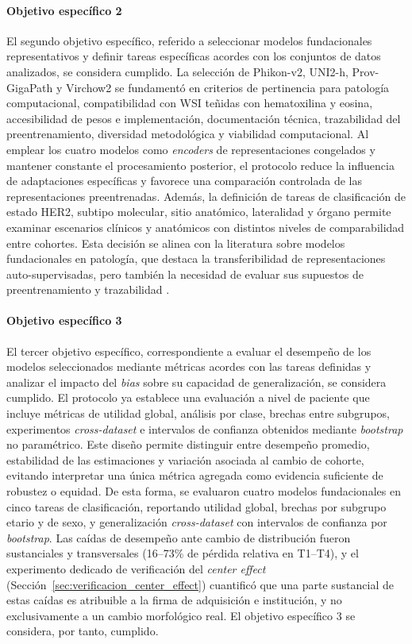 \paragraph{Objetivo específico 2} El segundo objetivo específico, referido a seleccionar modelos fundacionales representativos y definir tareas específicas acordes con los conjuntos de datos analizados, se considera cumplido. La selección de Phikon-v2, UNI2-h, Prov-GigaPath y Virchow2 se fundamentó en criterios de pertinencia para patología computacional, compatibilidad con WSI teñidas con hematoxilina y eosina, accesibilidad de pesos e implementación, documentación técnica, trazabilidad del preentrenamiento, diversidad metodológica y viabilidad computacional. Al emplear los cuatro modelos como \textit{encoders} de representaciones congelados y mantener constante el procesamiento posterior, el protocolo reduce la influencia de adaptaciones específicas y favorece una comparación controlada de las representaciones preentrenadas. Además, la definición de tareas de clasificación de estado HER2, subtipo molecular, sitio anatómico, lateralidad y órgano permite examinar escenarios clínicos y anatómicos con distintos niveles de comparabilidad entre cohortes. Esta decisión se alinea con la literatura sobre modelos fundacionales en patología, que destaca la transferibilidad de representaciones auto-supervisadas, pero también la necesidad de evaluar sus supuestos de preentrenamiento y trazabilidad \parencite{chen2024uni,filiot2024phikonv2,xu2024provgigapath,vorontsov2024virchow}.

\paragraph{Objetivo específico 3} El tercer objetivo específico, correspondiente a evaluar el desempeño de los modelos seleccionados mediante métricas acordes con las tareas definidas y analizar el impacto del \textit{bias} sobre su capacidad de generalización, se considera cumplido. El protocolo ya establece una evaluación a nivel de paciente que incluye métricas de utilidad global, análisis por clase, brechas entre subgrupos, experimentos \textit{cross-dataset} e intervalos de confianza obtenidos mediante \textit{bootstrap} no paramétrico. Este diseño permite distinguir entre desempeño promedio, estabilidad de las estimaciones y variación asociada al cambio de cohorte, evitando interpretar una única métrica agregada como evidencia suficiente de robustez o equidad. De esta forma, se evaluaron cuatro modelos fundacionales en cinco tareas de clasificación, reportando utilidad global, brechas por subgrupo etario y de sexo, y generalización \textit{cross-dataset} con intervalos de confianza por \textit{bootstrap}. Las caídas de desempeño ante cambio de distribución fueron sustanciales y transversales (16--73\% de pérdida relativa en T1--T4), y el experimento dedicado de verificación del \textit{center effect} (Sección~\ref{sec:verificacion_center_effect}) cuantificó que una parte sustancial de estas caídas es atribuible a la firma de adquisición e institución, y no exclusivamente a un cambio morfológico real. El objetivo específico 3 se considera, por tanto, cumplido.

